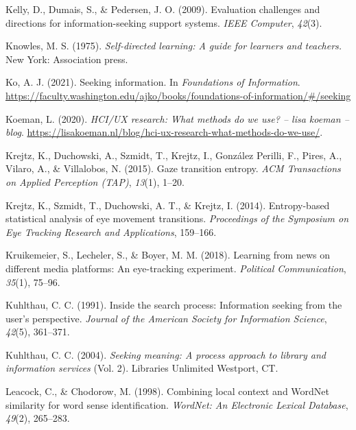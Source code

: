 \documentclass[letterpaper, nobind]{templates/ociamthesis}
\newlength{\cslhangindent}
\newenvironment{CSLReferences}[2] %
 {%
  \setlength{\parindent}{0pt}
  \ifodd #1
  \let\oldpar\par
  \def\par{\hangindent=\cslhangindent\oldpar}
  \fi
  \setlength{\parskip}{1mm}
  \setlength{\baselineskip}{6mm}
 }%
 {}
\begin{document}
\begin{CSLReferences}{1}{0}
\leavevmode{}%
Kelly, D., Dumais, S., \& Pedersen, J. O. (2009). Evaluation challenges and directions for information-seeking support systems. \emph{IEEE Computer}, \emph{42}(3).

\leavevmode{}%
Knowles, M. S. (1975). \emph{Self-directed learning: A guide for learners and teachers.} New York: Association press.

\leavevmode{}%
Ko, A. J. (2021). Seeking information. In \emph{Foundations of {Information}}. \url{https://faculty.washington.edu/ajko/books/foundations-of-information/\#/seeking}

\leavevmode{}%
Koeman, L. (2020). \emph{HCI/UX research: What methods do we use? -- lisa koeman -- blog}. \url{https://lisakoeman.nl/blog/hci-ux-research-what-methods-do-we-use/}.

\leavevmode{}%
Krejtz, K., Duchowski, A., Szmidt, T., Krejtz, I., González Perilli, F., Pires, A., Vilaro, A., \& Villalobos, N. (2015). Gaze transition entropy. \emph{ACM Transactions on Applied Perception (TAP)}, \emph{13}(1), 1--20.

\leavevmode{}%
Krejtz, K., Szmidt, T., Duchowski, A. T., \& Krejtz, I. (2014). Entropy-based statistical analysis of eye movement transitions. \emph{Proceedings of the Symposium on Eye Tracking Research and Applications}, 159--166.

\leavevmode{}%
Kruikemeier, S., Lecheler, S., \& Boyer, M. M. (2018). Learning from news on different media platforms: An eye-tracking experiment. \emph{Political Communication}, \emph{35}(1), 75--96.

\leavevmode{}%
Kuhlthau, C. C. (1991). Inside the search process: Information seeking from the user's perspective. \emph{Journal of the American Society for Information Science}, \emph{42}(5), 361--371.

\leavevmode{}%
Kuhlthau, C. C. (2004). \emph{Seeking meaning: A process approach to library and information services} (Vol. 2). Libraries Unlimited Westport, CT.

\leavevmode{}%
Leacock, C., \& Chodorow, M. (1998). Combining local context and WordNet similarity for word sense identification. \emph{WordNet: An Electronic Lexical Database}, \emph{49}(2), 265--283.


\end{CSLReferences}
\end{document}
